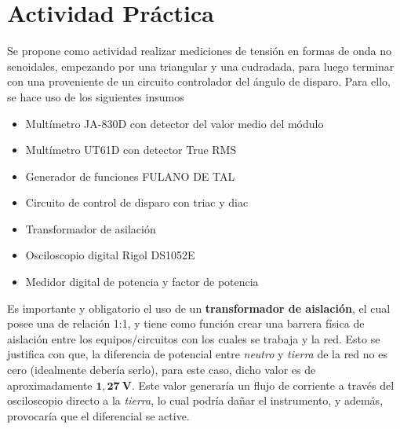   \section{Actividad Práctica}
    Se propone como actividad realizar mediciones de tensión en formas de onda no senoidales,
    empezando por una triangular y una cudradada, para luego terminar con una proveniente
    de un circuito controlador del ángulo de disparo. Para ello, se hace uso de los siguientes
    insumos

    \begin{itemize}
      \item Multímetro JA-830D con detector del valor medio del módulo
      \item Multímetro UT61D con detector True RMS
      \item Generador de funciones FULANO DE TAL
      \item Circuito de control de disparo con triac y diac
      \item Transformador de asilación
      \item Osciloscopio digital Rigol DS1052E
      \item Medidor digital de potencia y factor de potencia
    \end{itemize}
    
    Es importante y obligatorio el uso de un \textbf{transformador de aislación},
    el cual posee una de relación 1:1, y tiene como función crear una barrera física de aislación
    entre los equipos/circuitos con los cuales se trabaja y la red. Esto se justifica con que, la diferencia de
    potencial entre \textit{neutro} y \textit{tierra} de la red no es cero (idealmente debería serlo), para este caso, dicho
    valor es de aproximadamente $\mathbf{1,27\ V}$. Este valor generaría un flujo de corriente a través del osciloscopio 
    directo a la \textit{tierra}, lo cual podría dañar el instrumento, y además, provocaría que el diferencial se active.

    
    
    
